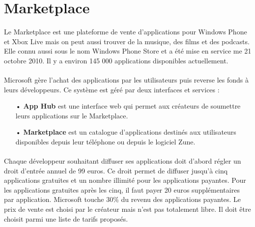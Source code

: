 \documentclass[twoside,UTF8]{EPURapport}
\begin{document}
\section{Marketplace}

\paragraph{}
Le Marketplace est une plateforme de vente d'applications pour Windows Phone et Xbox Live mais on peut aussi trouver de la musique, des films et des podcasts. Elle connu aussi sous le nom Windows Phone Store et a été mise en service me 21 octobre 2010. Il y a environ 145 000 applications disponibles actuellement.

\paragraph{}
Microsoft gère l'achat des applications par les utilisateurs puis reverse les fonds à leurs développeurs. Ce système est géré par deux interfaces et services : 
\begin{itemize}
	\item[•] \textbf{App Hub} est une interface web qui permet aux créateurs de soumettre leurs applications sur le Marketplace.
	\item[•]\textbf{Marketplace} est un catalogue d'applications destinés aux utilisateurs disponibles depuis leur téléphone ou depuis le logiciel Zune.
\end{itemize}

\paragraph{}
Chaque développeur souhaitant diffuser ses applications doit d'abord régler un droit d'entrée annuel de 99 euros. Ce droit permet de diffuser jusqu'à cinq applications gratuites et un nombre illimité pour les applications payantes. Pour les applications gratuites après les cinq, il faut payer 20 euros supplémentaires par application. Microsoft touche 30\% du revenu des applications payantes. Le prix de vente est choisi par le créateur mais n'est pas totalement libre. Il doit être choisit parmi une liste de tarifs proposés. 
\end{document}
